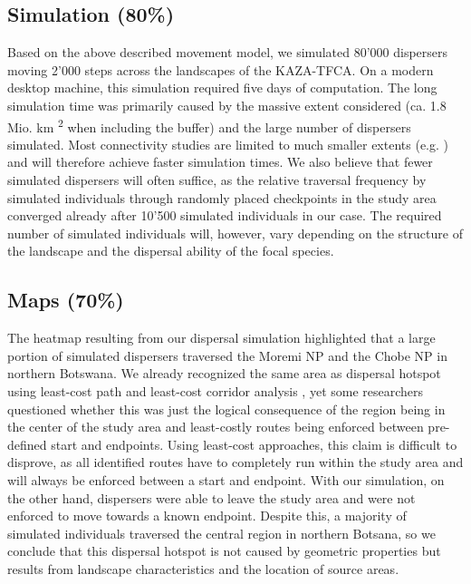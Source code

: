 \documentclass[abstract=on,10pt,a4paper,bibliography=totocnumbered]{article}
\begin{document}
\subsection{Simulation (80\%)}
Based on the above described movement model, we simulated 80'000 dispersers
moving 2'000 steps across the landscapes of the KAZA-TFCA. On a modern desktop
machine, this simulation required five days of computation. The long simulation
time was primarily caused by the massive extent considered (ca. 1.8 Mio. km
\textsuperscript{2} when including the buffer) and the large number of
dispersers simulated. Most connectivity studies are limited to much smaller
extents (e.g. \citealp{Kanagaraj.2013, Clark.2015, McClure.2016, Abrahms.2017,
Zeller.2020}) and will therefore achieve faster simulation times. We also
believe that fewer simulated dispersers will often suffice, as the relative
traversal frequency by simulated individuals through randomly placed checkpoints
in the study area converged already after 10'500 simulated individuals in our
case. The required number of simulated individuals will, however, vary depending
on the structure of the landscape and the dispersal ability of the focal
species.

\subsection{Maps (70\%)}
The heatmap resulting from our dispersal simulation highlighted that a large
portion of simulated dispersers traversed the Moremi NP and the Chobe NP in
northern Botswana. We already recognized the same area as dispersal hotspot
using least-cost path and least-cost corridor analysis \citep{Hofmann.2021}, yet
some researchers questioned whether this was just the logical consequence of the
region being in the center of the study area and least-costly routes being
enforced between pre-defined start and endpoints. Using least-cost approaches,
this claim is difficult to disprove, as all identified routes have to completely
run within the study area and will always be enforced between a start and
endpoint. With our simulation, on the other hand, dispersers were able to leave
the study area and were not enforced to move towards a known endpoint. Despite
this, a majority of simulated individuals traversed the central region in
northern Botsana, so we conclude that this dispersal hotspot is not caused by
geometric properties but results from landscape characteristics and the location
of source areas.
\end{document}
